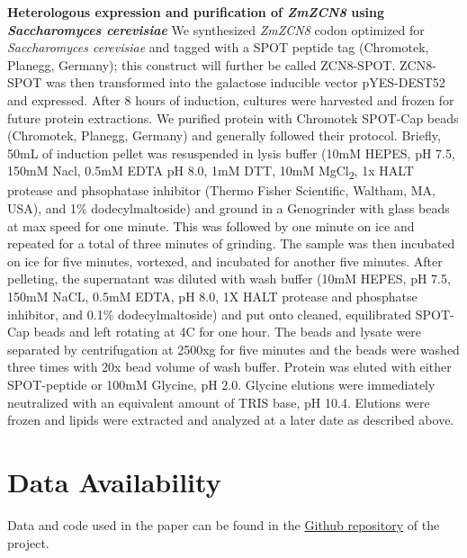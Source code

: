 \documentclass[9pt,twocolumn,twoside,lineno]{biorxiv}
\begin{document}
\textbf{Heterologous expression and purification of \textit{ZmZCN8} using \textit{Saccharomyces cerevisiae}}
We synthesized \textit{ZmZCN8} codon optimized for \textit{Saccharomyces cerevisiae} and tagged with a SPOT peptide tag (Chromotek, Planegg, Germany); this construct will further be called ZCN8-SPOT. 
ZCN8-SPOT was then transformed into the galactose inducible vector pYES-DEST52 and expressed. 
After 8 hours of induction, cultures were harvested and frozen for future protein extractions. 
We purified protein with Chromotek SPOT-Cap beads (Chromotek, Planegg, Germany) and generally followed their protocol. 
Briefly, 50mL of induction pellet was resuspended in lysis buffer (10mM HEPES, pH 7.5, 150mM Nacl, 0.5mM EDTA pH 8.0, 1mM DTT, 10mM MgCl\textsubscript{2}, 1x HALT protease and phsophatase inhibitor (Thermo Fisher Scientific, Waltham, MA, USA), and 1\% dodecylmaltoside) and ground in a Genogrinder with glass beads at max speed for one minute.
This was followed by one minute on ice and repeated for a total of three minutes of grinding.
The sample was then incubated on ice for five minutes, vortexed, and incubated for another five minutes. 
After pelleting, the supernatant was diluted with wash buffer (10mM HEPES, pH 7.5, 150mM NaCL, 0.5mM EDTA, pH 8.0, 1X HALT protease and phosphatse inhibitor, and 0.1\% dodecylmaltoside) and put onto cleaned, equilibrated SPOT-Cap beads and left rotating at 4\textdegree C for one hour.
The beads and lysate were separated by centrifugation at 2500xg for five minutes and the beads were washed three times with 20x bead volume of wash buffer. 
Protein was eluted with either SPOT-peptide or 100mM Glycine, pH 2.0. 
Glycine elutions were immediately neutralized with an equivalent amount of TRIS base, pH 10.4.
Elutions were frozen and lipids were extracted and analyzed at a later date as described above.

\section{Data Availability}
Data and code used in the paper can be found in the \href{https://github.com/sawers-rellan-labs/High-PC1-paper}{Github repository} of the project. 
\end{document}

